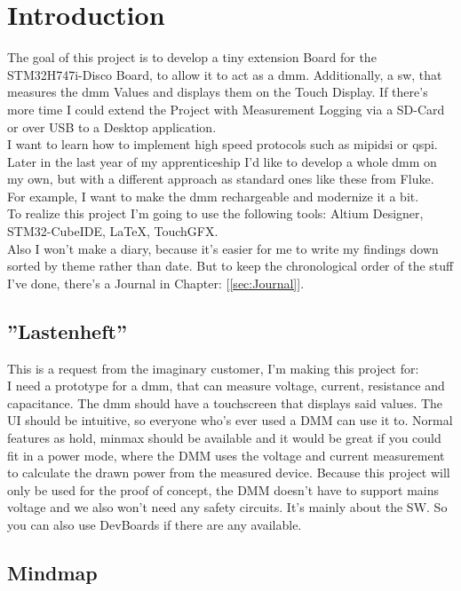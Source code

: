 \chapter{Introduction}
\label{cha:Introduction}


The goal of this project is to develop a tiny extension Board for the STM32H747i-Disco Board, to allow it to act as a \acs{dmm}. Additionally, a \acs{sw}, that measures the \acs{dmm} Values and displays them on the Touch Display. If there's more time I could extend the Project with Measurement Logging via a SD-Card or over USB to a Desktop application.
\\
I want to learn how to implement high speed protocols such as \acs{mipidsi} or \acs{qspi}. Later in the last year of my apprenticeship I'd like to develop a whole \acs{dmm} on my own, but with a different approach as standard ones like these from Fluke. For example, I want to make the \acs{dmm} rechargeable and modernize it a bit. 
\\
To realize this project I'm going to use the following tools: Altium Designer, STM32-CubeIDE, LaTeX, TouchGFX.
\\
Also I won't make a diary, because it's easier for me to write my findings down sorted by theme rather than date. But to keep the chronological order of the stuff I've done, there's a Journal in Chapter: [\ref{sec:Journal}].

\section{''Lastenheft''}
\label{sec:Lastenheft}
This is a request from the imaginary customer, I'm making this project for:
\\
I need a prototype for a \acs{dmm}, that can measure voltage, current, resistance and capacitance. The \acs{dmm} should have a touchscreen that displays said values. The UI should be intuitive, so everyone who's ever used a DMM can use it to. Normal features as hold, minmax should be available and it would be great if you could fit in a power mode, where the DMM uses the voltage and current measurement to calculate the drawn power from the measured device. Because this project will only be used for the proof of concept, the DMM doesn't have to support mains voltage and we also won't need any safety circuits. It's mainly about the SW. So you can also use DevBoards if there are any available.

\newpage

\section{Mindmap}
\label{sec:Mindmap}

